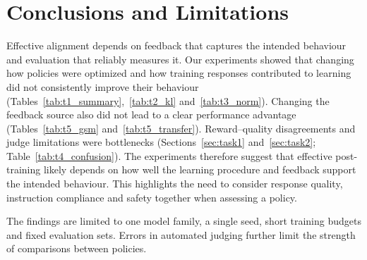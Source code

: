 \documentclass{article}
\begin{document}
\section{Conclusions and Limitations}
\label{sec:conclusion}

Effective alignment depends on feedback that captures the intended behaviour and evaluation that reliably measures it. Our experiments showed that changing how policies were optimized and how training responses contributed to learning did not consistently improve their behaviour (Tables~\ref{tab:t1_summary},~\ref{tab:t2_kl} and~\ref{tab:t3_norm}). Changing the feedback source also did not lead to a clear performance advantage (Tables~\ref{tab:t5_gsm} and~\ref{tab:t5_transfer}). Reward--quality disagreements and judge limitations were bottlenecks (Sections~\ref{sec:task1} and~\ref{sec:task2}; Table~\ref{tab:t4_confusion}). The experiments therefore suggest that effective post-training likely depends on how well the learning procedure and feedback support the intended behaviour. This highlights the need to consider response quality, instruction compliance and safety together when assessing a policy.

The findings are limited to one model family, a single seed, short training budgets and fixed evaluation sets. Errors in automated judging further limit the strength of comparisons between policies.
\end{document}
